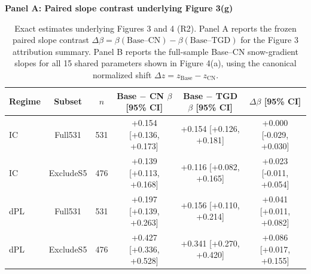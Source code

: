 \begin{table}[t]
\centering
\caption{Exact estimates underlying Figures 3 and 4 (R2). Panel A reports the frozen paired slope contrast $\Delta\beta = \beta(\mathrm{Base\text{--}CN}) - \beta(\mathrm{Base\text{--}TGD})$ for the Figure 3 attribution summary. Panel B reports the full-sample Base--CN snow-gradient slopes for all 15 shared parameters shown in Figure 4(a), using the canonical normalized shift $\Delta z = z_{\mathrm{Base}} - z_{\mathrm{CN}}$.}
\label{tab:tables4_exact_estimates_f3_f4}
\begin{threeparttable}
\textbf{Panel A: Paired slope contrast underlying Figure 3(g)}
\begin{tabular}{lccccc}
\toprule
Regime & Subset & $n$ & Base $-$ CN $\beta$ [95\% CI] & Base $-$ TGD $\beta$ [95\% CI] & $\Delta\beta$ [95\% CI] \\
\midrule
IC & Full531 & 531 & +0.154 [+0.136, +0.173] & +0.154 [+0.126, +0.181] & +0.000 [-0.029, +0.030] \\
IC & ExcludeS5 & 476 & +0.139 [+0.113, +0.168] & +0.116 [+0.082, +0.165] & +0.023 [-0.011, +0.054] \\
dPL & Full531 & 531 & +0.197 [+0.139, +0.263] & +0.156 [+0.110, +0.214] & +0.041 [+0.011, +0.082] \\
dPL & ExcludeS5 & 476 & +0.427 [+0.336, +0.528] & +0.341 [+0.270, +0.420] & +0.086 [+0.017, +0.155] \\
\bottomrule
\end{tabular}


\end{threeparttable}
\end{table}
